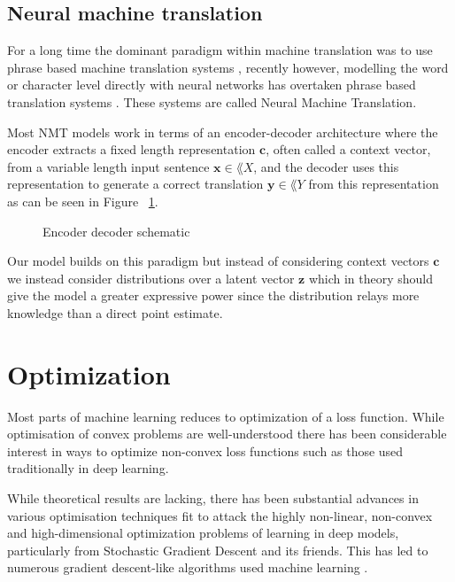 \subsection{Neural machine translation}
For a long time the dominant paradigm within machine translation was to use
phrase based machine translation systems \cite{Koehn:2003:SPT:1073445.1073462,
  Koehn:2007:MOS:1557769.1557821}, recently however, modelling the word or
character level directly with neural networks has overtaken phrase based
translation systems \cite{wolk_neural-based_2015, wu_googles_2016}. These
systems are called Neural Machine Translation.

Most NMT models work in terms of an encoder-decoder architecture where the
encoder extracts a fixed length representation $\bm{c}$, often called a context
vector, from a variable length input sentence $\bm{x} \in \lang{X}$, and the
decoder uses this representation to generate a correct translation $\bm{y} \in
\lang{Y}$ from this representation \cite{cho_properties_2014} as can be seen in
Figure ~\ref{fig:encoder_decoder}.

\begin{figure}[H]
    \caption{Encoder decoder schematic}
  \label{fig:encoder_decoder}
\end{figure}

Our model builds on this paradigm but instead of considering context vectors
$\bm{c}$ we instead consider distributions over a latent vector $\bm{z}$ which
in theory should give the model a greater expressive power since the
distribution relays more knowledge than a direct point estimate.

\section{Optimization}

Most parts of machine learning reduces to optimization of a loss function. While
optimisation of convex problems are well-understood there has been considerable
interest in ways to optimize non-convex loss functions such as those used
traditionally in deep learning.

While theoretical results are lacking, there has been substantial
advances in various optimisation techniques fit to attack the highly non-linear,
non-convex and high-dimensional optimization problems of learning in deep
models, particularly from Stochastic Gradient Descent and its friends. This has
led to numerous gradient descent-like algorithms used machine learning
\cite{Ruder17}.

